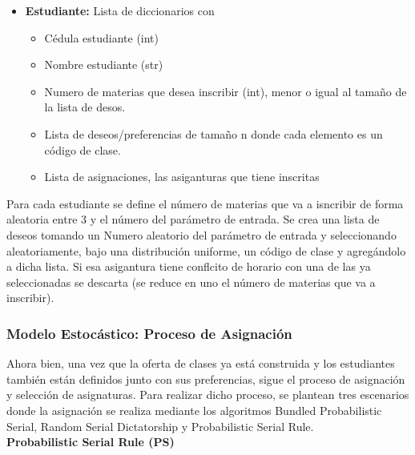 \documentclass{article}
\begin{document}
\begin{itemize}
  \item \textbf{Estudiante:} Lista de diccionarios con
        \begin{itemize}
          \item Cédula estudiante (int)
          \item Nombre estudiante (str)
          \item Numero de materias que desea inscribir (int), menor o igual al tamaño
                de la lista de desos.
          \item Lista de deseos/preferencias de tamaño n donde cada elemento es un código de clase.
          \item Lista de asignaciones, las asiganturas que tiene inscritas
        \end{itemize}
\end{itemize}

Para cada estudiante se define el número de materias que va a isncribir de forma aleatoria
entre 3 y el número del parámetro de entrada. Se crea una lista de deseos tomando un Numero
aleatorio del parámetro de entrada y seleccionando aleatoriamente, bajo una distribución 
uniforme, un código de clase y agregándolo a dicha lista. Si esa asigantura tiene conflcito de
horario con una de las ya seleccionadas se descarta (se reduce en uno el número de materias
que va a inscribir).

\subsubsection{Modelo Estocástico: Proceso de Asignación}

Ahora bien, una vez que la oferta de clases ya está construida y los estudiantes también están 
definidos junto con sus preferencias, sigue el proceso de asignación y selección de asignaturas. 
Para realizar dicho proceso, se plantean tres escenarios donde la asignación se realiza mediante 
los algoritmos Bundled Probabilistic Serial, Random Serial Dictatorship y Probabilistic Serial Rule.\\


\textbf{Probabilistic Serial Rule (PS)}
\end{document}
